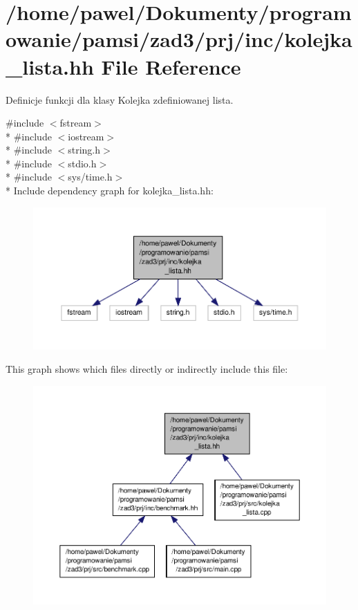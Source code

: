 \hypertarget{kolejka__lista_8hh}{\section{/home/pawel/\-Dokumenty/programowanie/pamsi/zad3/prj/inc/kolejka\-\_\-lista.hh File Reference}
\label{kolejka__lista_8hh}
}


Definicje funkcji dla klasy Kolejka zdefiniowanej lista.  


{\ttfamily \#include $<$fstream$>$}\\*
{\ttfamily \#include $<$iostream$>$}\\*
{\ttfamily \#include $<$string.\-h$>$}\\*
{\ttfamily \#include $<$stdio.\-h$>$}\\*
{\ttfamily \#include $<$sys/time.\-h$>$}\\*
Include dependency graph for kolejka\-\_\-lista.\-hh\-:\nopagebreak
\begin{figure}[H]
\begin{center}
\leavevmode
\includegraphics[width=350pt]{kolejka__lista_8hh__incl}
\end{center}
\end{figure}
This graph shows which files directly or indirectly include this file\-:\nopagebreak
\begin{figure}[H]
\begin{center}
\leavevmode
\includegraphics[width=350pt]{kolejka__lista_8hh__dep__incl}
\end{center}
\end{figure}
